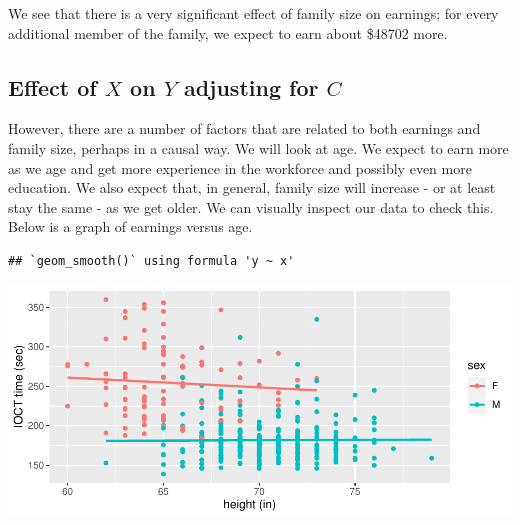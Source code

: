 \documentclass[]{book}
\newenvironment{Shaded}{\begin{snugshade}}{\end{snugshade}}
\newcommand{\DataTypeTok}[1]{\textcolor[rgb]{0.13,0.29,0.53}{#1}}
\newcommand{\KeywordTok}[1]{\textcolor[rgb]{0.13,0.29,0.53}{\textbf{#1}}}
\newcommand{\NormalTok}[1]{#1}
\newcommand{\OperatorTok}[1]{\textcolor[rgb]{0.81,0.36,0.00}{\textbf{#1}}}
\newcommand{\OtherTok}[1]{\textcolor[rgb]{0.56,0.35,0.01}{#1}}
\newcommand{\StringTok}[1]{\textcolor[rgb]{0.31,0.60,0.02}{#1}}
\begin{document}
We see that there is a very significant effect of family size on earnings; for every additional member of the family, we expect to earn about \$48702 more.

\hypertarget{effect-of-x-on-y-adjusting-for-c-1}{%
\subsection{\texorpdfstring{Effect of \(X\) on \(Y\) adjusting for \(C\)}{Effect of X on Y adjusting for C}}\label{effect-of-x-on-y-adjusting-for-c-1}}

However, there are a number of factors that are related to both earnings and family size, perhaps in a causal way. We will look at age. We expect to earn more as we age and get more experience in the workforce and possibly even more education. We also expect that, in general, family size will increase - or at least stay the same - as we get older. We can visually inspect our data to check this. Below is a graph of earnings versus age.

\begin{Shaded}
\end{Shaded}

\begin{verbatim}
## `geom_smooth()` using formula 'y ~ x'
\end{verbatim}

\includegraphics{MA206supplement_files/figure-latex/unnamed-chunk-18-1.pdf}
\end{document}
